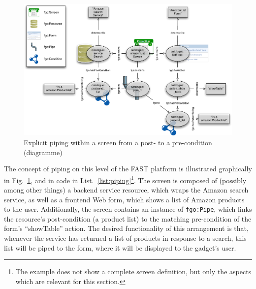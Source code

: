 \documentclass[twoside]{fast_latex}
\begin{document}
\begin{figure}
  \begin{center}
    \includegraphics[width=\linewidth]{images/declarativeDefinitionExample.pdf}
    \caption{Explicit piping within a screen from a post- to a pre-condition (diagramme)}
    \label{fig:piping}
  \end{center}
\end{figure}

The concept of piping on this level of the FAST platform is illustrated graphically in Fig.~\ref{fig:piping}, and in code in List.~\ref{list:piping}\footnote{The example does not show a complete screen definition, but only the aspects which are relevant for this section.}. The screen is composed of (possibly among other things) a backend service resource, which wraps the Amazon search service, as well as a frontend Web form, which shows a list of Amazon products to the user. Additionally, the screen contains an instance of \texttt{fgo:Pipe}, which links the resource's post-condition (a product list) to the matching pre-condition of the form's ``showTable'' action. The desired functionality of this arrangement is that, whenever the service has returned a list of products in response to a search, this list will be piped to the form, where it will be displayed to the gadget's user.

\singlespacing
{}
\begin{figure}
	
\end{figure}
\doublespacing


\end{document}
